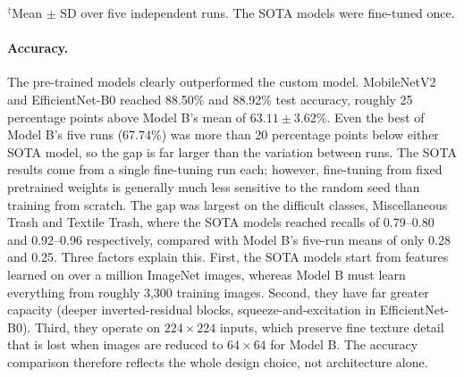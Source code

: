 \documentclass[12pt,a4paper]{article}
\begin{document}
\begin{table}[H]
\centering
\caption{Final comparison of Model B and the fine-tuned SOTA models}
\label{tab:final_comparison}

\vspace{1mm}
\footnotesize $^{\dagger}$Mean $\pm$ SD over five independent runs. The
SOTA models were fine-tuned once.
\end{table}

\paragraph{Accuracy.}
The pre-trained models clearly outperformed the custom model. MobileNetV2
and EfficientNet-B0 reached 88.50\% and 88.92\% test accuracy, roughly 25
percentage points above Model B's mean of $63.11\pm3.62\%$. Even the best
of Model B's five runs (67.74\%) was more than 20 percentage points below
either SOTA model, so the gap is far larger than the variation between
runs. The SOTA results come from a single fine-tuning run each; however,
fine-tuning from fixed pretrained weights is generally much less
sensitive to the random seed than training from scratch. The gap was
largest on the difficult classes, Miscellaneous Trash and Textile Trash,
where the SOTA models reached recalls of 0.79--0.80 and 0.92--0.96
respectively, compared with Model B's five-run means of only 0.28 and
0.25. Three factors explain this. First, the
SOTA models start from features learned on over a million ImageNet
images, whereas Model B must learn everything from roughly 3,300
training images. Second, they have far greater capacity (deeper
inverted-residual blocks, squeeze-and-excitation in EfficientNet-B0).
Third, they operate on $224\times224$ inputs, which preserve fine texture
detail that is lost when images are reduced to $64\times64$ for Model B.
The accuracy comparison therefore reflects the whole design choice, not
architecture alone.
\end{document}

